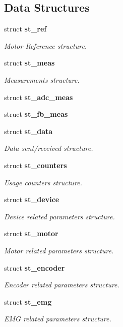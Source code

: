 \subsection*{Data Structures}
\begin{DoxyCompactItemize}
\item 
struct \textbf{ st\+\_\+ref}
\begin{DoxyCompactList}\small\item\em Motor Reference structure. \end{DoxyCompactList}\item 
struct \textbf{ st\+\_\+meas}
\begin{DoxyCompactList}\small\item\em Measurements structure. \end{DoxyCompactList}\item 
struct \textbf{ st\+\_\+adc\+\_\+meas}
\item 
struct \textbf{ st\+\_\+fb\+\_\+meas}
\item 
struct \textbf{ st\+\_\+data}
\begin{DoxyCompactList}\small\item\em Data sent/received structure. \end{DoxyCompactList}\item 
struct \textbf{ st\+\_\+counters}
\begin{DoxyCompactList}\small\item\em Usage counters structure. \end{DoxyCompactList}\item 
struct \textbf{ st\+\_\+device}
\begin{DoxyCompactList}\small\item\em Device related parameters structure. \end{DoxyCompactList}\item 
struct \textbf{ st\+\_\+motor}
\begin{DoxyCompactList}\small\item\em Motor related parameters structure. \end{DoxyCompactList}\item 
struct \textbf{ st\+\_\+encoder}
\begin{DoxyCompactList}\small\item\em Encoder related parameters structure. \end{DoxyCompactList}\item 
struct \textbf{ st\+\_\+emg}
\begin{DoxyCompactList}\small\item\em E\+MG related parameters structure. \end{DoxyCompactList}\item 

\end{DoxyCompactItemize}
